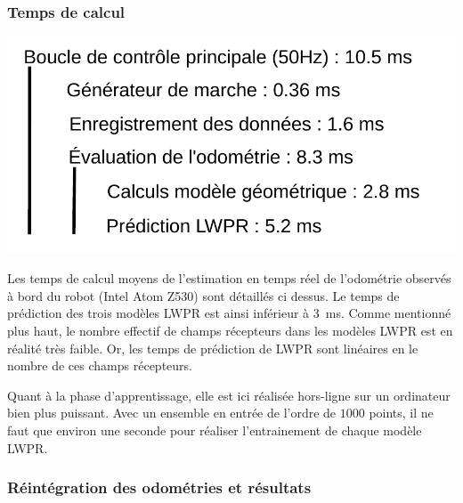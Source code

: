 \subsubsection{Temps de calcul}

\includegraphics[type=pdf,ext=.pdf,read=.pdf,width=0.6\linewidth]{../schema/odometry_lwpr_perfs}

Les temps de calcul moyens de l'estimation en temps réel de l'odométrie observés 
à bord du robot (Intel Atom Z530) sont détaillés ci dessus.
Le temps de prédiction des trois modèles LWPR est ainsi inférieur à $3$~ms.
Comme mentionné plus haut, le nombre effectif de champs récepteurs dans les modèles
LWPR est en réalité très faible. 
Or, les temps de prédiction de LWPR sont linéaires en le nombre de ces
champs récepteurs.

Quant à la phase d'apprentissage, elle est ici réalisée hors-ligne 
sur un ordinateur bien plus puissant.
Avec un ensemble en entrée de l'ordre de $1000$ points, il ne faut que environ 
une seconde pour réaliser l'entrainement de chaque modèle LWPR.

\subsubsection{Réintégration des odométries et résultats\label{sec:odometry_lwpr_results}}

